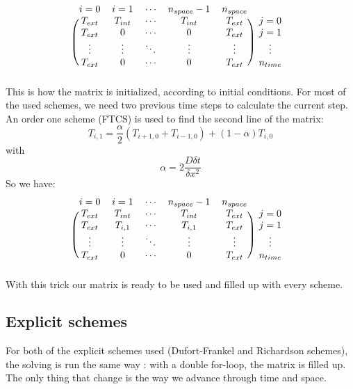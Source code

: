 \documentclass{article}
\begin{document}
        \[
            \begin{blockarray}{cccccc}
            i=0 & i=1 & \cdots & n_{space}-1 & n_{space} \\
            \begin{block}{(ccccc)c}
              T_{ext} & T_{int} & \cdots & T_{int} & T_{ext} & j=0 \\
              T_{ext} & 0 & \cdots & 0 & T_{ext} & j=1 \\
              \vdots & \vdots & \ddots & \vdots & \vdots & \vdots \\
              T_{ext} & 0 & \cdots & 0 & T_{ext} & n_{time} \\
            \end{block}
            \end{blockarray}
        \]
        This is how the matrix is initialized, according to initial conditions.
        For most of the used schemes, we need two previous time steps to calculate the current step.
        An order one scheme (FTCS) is used to find the second line of the matrix:
        \begin{equation}
            T_{i,1} = \frac{\alpha}{2} (T_{i+1,0} + T_{i-1,0}) + (1-\alpha)T_{i,0}
        \end{equation}
        with $$\alpha = 2\frac{D\delta t}{\delta x^{2}}$$
        So we have:
        \[
            \begin{blockarray}{cccccc}
            i = 0 & i = 1 & \cdots & n_{space}-1 & n_{space} \\
            \begin{block}{(ccccc)c}
              T_{ext} & T_{int} & \cdots & T_{int} & T_{ext} & j=0 \\
              T_{ext} & T_{i,1} & \cdots & T_{i,1} & T_{ext} & j=1 \\
              \vdots & \vdots & \ddots & \vdots & \vdots & \vdots \\
              T_{ext} & 0 & \cdots & 0 & T_{ext} & n_{time} \\
            \end{block}
            \end{blockarray}
        \]
        With this trick our matrix is ready to be used and filled up with every scheme.

        \subsection{Explicit schemes}
            For both of the explicit schemes used (Dufort-Frankel and Richardson schemes), the solving
            is run the same way : with a double for-loop, the matrix is filled up. The only thing that change
            is the way we advance through time and space.
\end{document}
